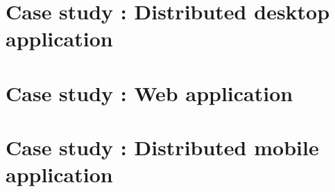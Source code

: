\chapter{Case study : Distributed desktop application}\label{appendix:case-study:a}



\chapter{Case study : Web application}\label{appendix:case-study:b}



\chapter{Case study : Distributed mobile application}\label{appendix:case-study:c}

